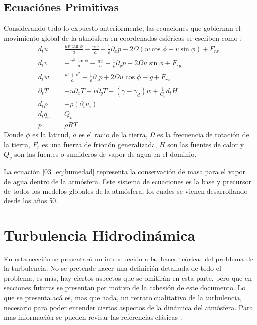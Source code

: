 \subsection{Ecuaciónes Primitivas}
Considerando todo lo expuesto anteriormente, las ecuaciones que gobiernan el movimiento global de la atmósfera en coordenadas esféricas se escriben como \citep{warner2010numerical}:
\begin{align}
d_t u &= \frac{uv\tan\phi}{a}-\frac{uw}{a}-\frac{1}{\rho}\partial_x p - 2\Omega(w\cos\phi - v\sin\phi) + F_{rx}\\
d_t v &= -\frac{u^2\tan\phi}{a}-\frac{uw}{a}-\frac{1}{\rho}\partial_y p - 2\Omega u\sin\phi + F_{ry}\\
d_t w &= \frac{u^2 + v^2}{a}-\frac{1}{\rho}\partial_z p + 2\Omega u\cos\phi -g + F_{rz}\\
\partial_t T &= -u\partial_x T -v\partial_y T + (\gamma-\gamma_d)w+\frac{1}{C_p}d_t H\\
d_t \rho &= -\rho(\partial_i u_i)\\
d_t q_v &= Q_v\label{03_eq:humedad}\\
p &= \rho R T
\end{align}
Donde $\phi$ es la latitud, $a$ es el radio de la tierra, $\Omega$ es la frecuencia de rotación de la tierra, $F_r$ es una fuerza de fricción generalizada, $H$ son las fuentes de calor y $Q_v$ son las fuentes o sumideros de vapor de agua en el dominio.

La ecuación \ref{03_eq:humedad} representa la conservación de masa para el vapor de agua dentro de la atmósfera. Este sistema de ecuaciones es la base y precursor de todos los modelos globales de la atmósfera, los cuales se vienen desarrollando desde los años 50.
\newpage
\section{Turbulencia Hidrodinámica}
En esta sección se presentará un introducción a las bases teóricas del problema de la turbulencia. No se pretende hacer una definición detallada de todo el problema, es más, hay ciertos aspectos que se omitirán en esta parte, pero que en secciones futuras se presentan por motivo de la cohesión de este documento. Lo que se presenta acá es, mas que nada, un retrato cualitativo de la turbulencia, necesario para poder entender ciertos aspectos de la dinámica del atmósfera. Para mas información se pueden revisar las referencias clásicas \citep{pope2000turbulent,davidson2013turbulence,9780521775380}.
